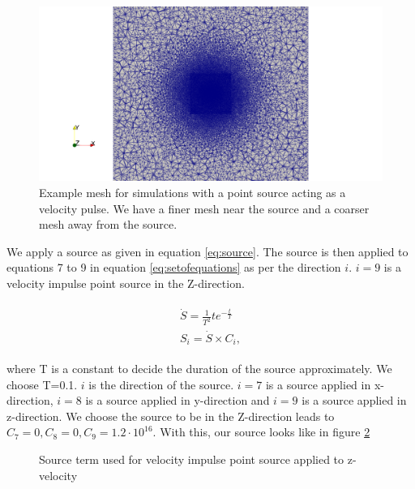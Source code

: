 \begin{figure}
    \centering
    \includegraphics[width=\linewidth]{figures/mesh_loh1.png}
    \caption{Example mesh for simulations with a point source acting as a velocity pulse. We have a finer mesh near the source and a coarser mesh away from the source.}
    \label{fig:mesh-loh1}
\end{figure}

We apply a source as given in equation \ref{eq:source}. The source is then applied to equations 7 to 9 in equation \ref{eq:setofequations} as per the direction
$i$. $i=9$ is a velocity impulse point source in the Z-direction.

\begin{align}
    \begin{split}
        \dot{S} = \frac{1}{T^2} t e^{-\frac{t}{T}} \\
        S_i = \dot{S} \times C_i ,
    \end{split}
    \label{eq:source}
\end{align}

where T is a constant to decide the duration of the source approximately. We choose T=0.1. $i$ is the direction of the source. $i=7$ is a source applied in x-direction,
$i=8$ is a source applied in y-direction and $i=9$ is a source applied in z-direction. 
We choose the source to be in the Z-direction leads to $C_7 = 0, C_8 = 0, C_9 = 1.2 \cdot 10^{16}$. With this, our source looks like in figure \ref{fig:source}

\begin{figure}
    \centering
    \caption{Source term used for velocity impulse point source applied to z-velocity}
    \label{fig:source}
\end{figure}

